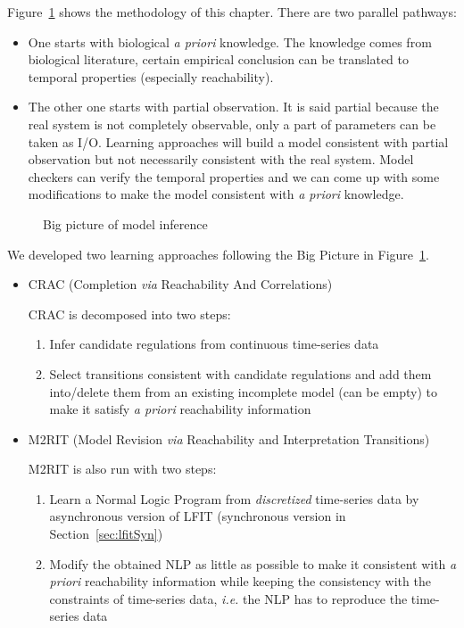 Figure~\ref{fig:bigPicture} shows the methodology of this chapter.
There are two parallel pathways: 
\begin{itemize}
    \item One starts with biological \textit{a priori} knowledge.
    The knowledge comes from biological literature, certain empirical conclusion can be translated to temporal properties (especially reachability).
    \item The other one starts with partial observation.
    It is said partial because the real system is not completely observable, only a part of parameters can be taken as I/O. 
    Learning approaches will build a model consistent with partial observation but not necessarily consistent with the real system.
    Model checkers can verify the temporal properties and we can come up with some modifications to make the model consistent with \textit{a priori} knowledge.
\end{itemize}

\begin{figure}[ht]
    \centering
    
    \caption{Big picture of model inference}\label{fig:bigPicture}
\end{figure}

We developed two learning approaches following the Big Picture in Figure~\ref{fig:bigPicture}.

\begin{itemize}
    \item CRAC (Completion \textit{via} Reachability And Correlations)
    
    CRAC is decomposed into two steps:
    \begin{enumerate}
        \item Infer candidate regulations from continuous time-series data
        \item Select transitions consistent with candidate regulations and add them into/delete them from an existing incomplete model (can be empty) to make it satisfy \textit{a priori} reachability information
    \end{enumerate}
    \item M2RIT (Model Revision \textit{via} Reachability and Interpretation Transitions)
    
    M2RIT is also run with two steps:
    \begin{enumerate}
        \item Learn a Normal Logic Program from \textit{discretized} time-series data by asynchronous version of LFIT (synchronous version in Section~\ref{sec:lfitSyn})
        \item Modify the obtained NLP as little as possible to make it consistent with \textit{a priori} reachability information while keeping the consistency with the constraints of time-series data, \textit{i.e.} the NLP has to reproduce the time-series data
    \end{enumerate}
\end{itemize}


